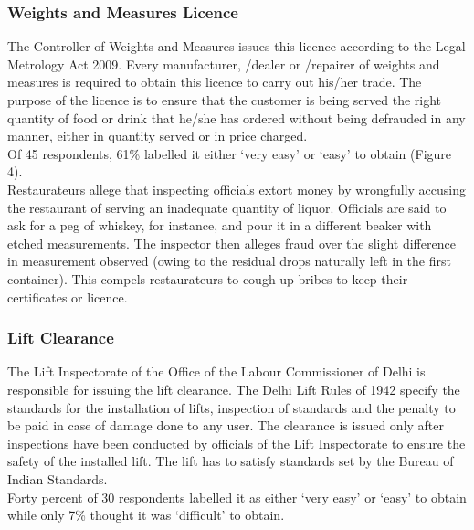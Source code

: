 \documentclass[a4paper, 12pt]{article}
\begin{document}
		
		\subsubsection{Weights and Measures Licence}
		The Controller of Weights and Measures issues this licence according to the Legal Metrology Act 2009. Every manufacturer, /dealer or /repairer of weights and measures is required to obtain this licence to carry out his/her trade. The purpose of the licence is to ensure that the customer is being served the right quantity of food or drink that he/she has ordered without being defrauded in any manner, either in quantity served or in price charged.\\
		Of 45 respondents, 61\% labelled it either ‘very easy’ or ‘easy’ to obtain (Figure 4). \\%
		Restaurateurs allege that inspecting officials extort money by wrongfully accusing the restaurant of serving an inadequate quantity of liquor. Officials are said to ask for a peg of whiskey, for instance, and pour it in a different beaker with etched measurements. The inspector then alleges fraud over the slight difference in measurement observed (owing to the residual drops naturally left in the first container). This compels restaurateurs to cough up bribes to keep their certificates or licence.
	
	
		\subsubsection{Lift Clearance}
		The Lift Inspectorate of the Office of the Labour Commissioner of Delhi is responsible for issuing the lift clearance. The Delhi Lift Rules of 1942 specify the standards for the installation of lifts, inspection of standards and the penalty to be paid in case of damage done to any user. The clearance is issued only after inspections have been conducted by officials of the Lift Inspectorate to ensure the safety of the installed lift. The lift has to satisfy standards set by the Bureau of Indian Standards.\\
		Forty percent of 30 respondents labelled it as either ‘very easy’ or ‘easy’ to obtain while only 7\% thought it was ‘difficult’ to obtain. %
		
		
\end{document}
